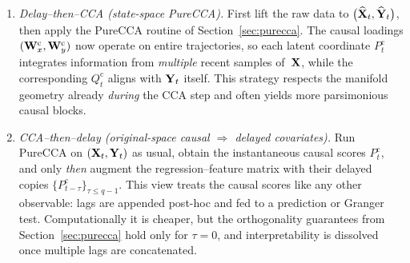 \documentclass[14pt]{extarticle}
\begin{document}
	\begin{enumerate}[label=\textbf{Schema \roman*.}]
		\item \emph{Delay--then–CCA (state-space PureCCA).}  
		First lift the raw data to $\bigl(\widehat{\mathbf{X}}_t,\widehat{\mathbf{Y}}_t\bigr)$,
		then apply the PureCCA routine of Section~\ref{sec:purecca}.  
		The causal loadings $(\mathbf{W}_x^{\mathrm c},\mathbf{W}_y^{\mathrm c})$ now
		operate on entire trajectories, so each latent coordinate
		$P_t^{\mathrm c}$ integrates information from \emph{multiple} recent
		samples of~$\mathbf{X}$, while the corresponding $Q_t^{\mathrm c}$ aligns
		with $\mathbf{Y}_t$ itself.  
		This strategy respects the manifold geometry already \emph{during}
		the CCA step and often yields more parsimonious causal blocks.
		
		\item \emph{CCA--then–delay (original-space causal $\Rightarrow$ delayed covariates).}  
		Run PureCCA on $(\mathbf{X}_t,\mathbf{Y}_t)$ as usual, obtain the
		instantaneous causal scores $P_t^{\mathrm c}$, and only \emph{then}
		augment the regression–feature matrix with their delayed copies
		$\bigl\{P_{t-\tau}^{\mathrm c}\bigr\}_{\tau\le q-1}$.  
		This view treats the causal scores like any other observable:
		lags are appended post-hoc and fed to a prediction or Granger test.
		Computationally it is cheaper, but the orthogonality guarantees from
		Section~\ref{sec:purecca} hold only for $\tau=0$, and
		interpretability is dissolved once multiple lags are concatenated.
	\end{enumerate}
	
\end{document}
